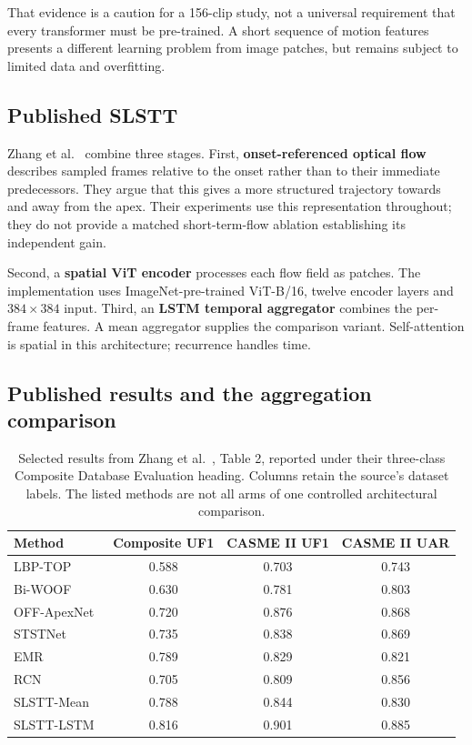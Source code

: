 That evidence is a caution for a 156-clip study, not a universal requirement that every transformer must be pre-trained. A short sequence of motion features presents a different learning problem from image patches, but remains subject to limited data and overfitting.

\subsection{Published SLSTT}
\label{sec:slstt-architecture}

Zhang et al.~\cite{zhang2022} combine three stages. First, \textbf{onset-referenced optical flow} describes sampled frames relative to the onset rather than to their immediate predecessors. They argue that this gives a more structured trajectory towards and away from the apex. Their experiments use this representation throughout; they do not provide a matched short-term-flow ablation establishing its independent gain.

Second, a \textbf{spatial ViT encoder} processes each flow field as patches. The implementation uses ImageNet-pre-trained ViT-B/16, twelve encoder layers and $384\times384$ input. Third, an \textbf{LSTM temporal aggregator} combines the per-frame features. A mean aggregator supplies the comparison variant. Self-attention is spatial in this architecture; recurrence handles time.

\subsection{Published results and the aggregation comparison}
\label{sec:slstt-results}

\begin{table}[htbp]
    \centering
    \small
    \begin{tabular}{@{}lccc@{}}
        \hline
        \textbf{Method} & \textbf{Composite UF1} & \textbf{CASME II UF1} & \textbf{CASME II UAR} \\
        \hline
        LBP-TOP & 0.588 & 0.703 & 0.743 \\
        Bi-WOOF & 0.630 & 0.781 & 0.803 \\
        OFF-ApexNet~\cite{liong2019a} & 0.720 & 0.876 & 0.868 \\
        STSTNet~\cite{liong2019b} & 0.735 & 0.838 & 0.869 \\
        EMR~\cite{liu2019} & 0.789 & 0.829 & 0.821 \\
        RCN~\cite{xia2020b} & 0.705 & 0.809 & 0.856 \\
        SLSTT-Mean & 0.788 & 0.844 & 0.830 \\
        SLSTT-LSTM & 0.816 & 0.901 & 0.885 \\
        \hline
    \end{tabular}
    \caption[SLSTT and comparison results]{Selected results from Zhang et al.~\cite{zhang2022}, Table 2, reported under their three-class Composite Database Evaluation heading. Columns retain the source's dataset labels. The listed methods are not all arms of one controlled architectural comparison.}
    \label{tab:slstt-results}
\end{table}

